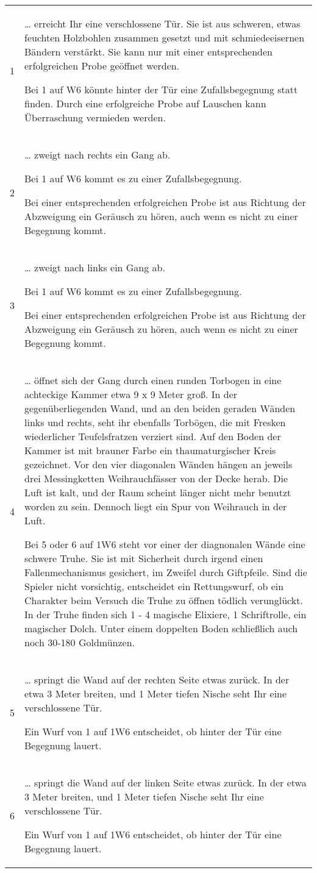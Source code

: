 \begin{tabularx}{\columnwidth}{cZ}
\def\labelenumi{\arabic{enumi}.}
1 & 
  \ldots{} erreicht Ihr eine verschlossene Tür. Sie ist aus schweren,
  etwas feuchten Holzbohlen zusammen gesetzt und mit schmiedeeisernen
  Bändern verstärkt. Sie kann nur mit einer entsprechenden erfolgreichen
  Probe geöffnet werden.

  Bei 1 auf W6 könnte hinter der Tür eine Zufallsbegegnung statt finden.
  Durch eine erfolgreiche Probe auf Lauschen kann Überraschung vermieden
  werden.
\\
2 & 
  \ldots{} zweigt nach rechts ein Gang ab.

  Bei 1 auf W6 kommt es zu einer Zufallsbegegnung.

  Bei einer entsprechenden erfolgreichen Probe ist aus Richtung der
  Abzweigung ein Geräusch zu hören, auch wenn es nicht zu einer
  Begegnung kommt.
\\
3 & 
  \ldots{} zweigt nach links ein Gang ab.

  Bei 1 auf W6 kommt es zu einer Zufallsbegegnung.

  Bei einer entsprechenden erfolgreichen Probe ist aus Richtung der
  Abzweigung ein Geräusch zu hören, auch wenn es nicht zu einer
  Begegnung kommt.
\\
4 & 
  \ldots{} öffnet sich der Gang durch einen runden Torbogen in eine
  achteckige Kammer etwa 9 x 9 Meter groß. In der gegenüberliegenden
  Wand, und an den beiden geraden Wänden links und rechts, seht ihr
  ebenfalls Torbögen, die mit Fresken wiederlicher Teufelsfratzen
  verziert sind. Auf den Boden der Kammer ist mit brauner Farbe ein
  thaumaturgischer Kreis gezeichnet. Vor den vier diagonalen Wänden
  hängen an jeweils drei Messingketten Weihrauchfässer von der Decke
  herab. Die Luft ist kalt, und der Raum scheint länger nicht mehr
  benutzt worden zu sein. Dennoch liegt ein Spur von Weihrauch in der
  Luft.

  Bei 5 oder 6 auf 1W6 steht vor einer der diagnonalen Wände eine
  schwere Truhe. Sie ist mit Sicherheit durch irgend einen
  Fallenmechanismus gesichert, im Zweifel durch Giftpfeile. Sind die
  Spieler nicht vorsichtig, entscheidet ein Rettungswurf, ob ein
  Charakter beim Versuch die Truhe zu öffnen tödlich verunglückt. In der
  Truhe finden sich 1 - 4 magische Elixiere, 1 Schriftrolle, ein
  magischer Dolch. Unter einem doppelten Boden schließlich auch noch
  30-180 Goldmünzen.
\\
5 & 
  \ldots{} springt die Wand auf der rechten Seite etwas zurück. In der
  etwa 3 Meter breiten, und 1 Meter tiefen Nische seht Ihr eine
  verschlossene Tür.

  Ein Wurf von 1 auf 1W6 entscheidet, ob hinter der Tür eine Begegnung
  lauert.
\\
6 & 
  \ldots{} springt die Wand auf der linken Seite etwas zurück. In der
  etwa 3 Meter breiten, und 1 Meter tiefen Nische seht Ihr eine
  verschlossene Tür.

  Ein Wurf von 1 auf 1W6 entscheidet, ob hinter der Tür eine Begegnung
  lauert.
\\
\end{tabularx}
